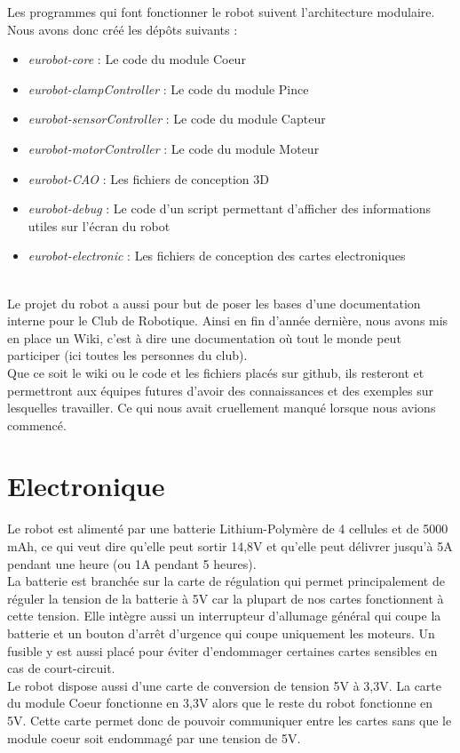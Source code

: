 Les programmes qui font fonctionner le robot suivent l'architecture modulaire. Nous avons donc créé les dépôts suivants :\\
\begin{itemize}
	\item \textit{eurobot-core} : Le code du module Coeur
	\item \textit{eurobot-clampController} : Le code du module Pince
	\item \textit{eurobot-sensorController} : Le code du module Capteur
	\item \textit{eurobot-motorController} : Le code du module Moteur
	\item \textit{eurobot-CAO} : Les fichiers de conception 3D
	\item \textit{eurobot-debug} : Le code d'un script permettant d'afficher des informations utiles sur l'écran du robot
	\item \textit{eurobot-electronic} : Les fichiers de conception des cartes electroniques
\end{itemize}\ \\

Le projet du robot a aussi pour but de poser les bases d'une documentation interne pour le Club de Robotique. Ainsi en fin d'année dernière, nous avons mis en place un Wiki, c'est à dire une documentation où tout le monde peut participer (ici toutes les personnes du club).\\

Que ce soit le wiki ou le code et les fichiers placés sur github, ils resteront et permettront aux équipes futures d'avoir des connaissances et des exemples sur lesquelles travailler. Ce qui nous avait cruellement manqué lorsque nous avions commencé.

\section{Electronique}
Le robot est alimenté par une batterie Lithium-Polymère de 4 cellules et de 5000 mAh, ce qui veut dire qu'elle peut sortir 14,8V et qu'elle peut délivrer jusqu'à 5A pendant une heure (ou 1A pendant 5 heures). \\

La batterie est branchée sur la carte de régulation qui permet principalement de réguler la tension de la batterie à 5V car la plupart de nos cartes fonctionnent à cette tension. Elle intègre aussi un interrupteur d'allumage général qui coupe la batterie et un bouton d'arrêt d'urgence qui coupe uniquement les moteurs. Un fusible y est aussi placé pour éviter d'endommager certaines cartes sensibles en cas de court-circuit. \\

Le robot dispose aussi d'une carte de conversion de tension 5V à 3,3V. La carte du module Coeur fonctionne en 3,3V alors que le reste du robot fonctionne en 5V. Cette carte permet donc de pouvoir communiquer entre les cartes sans que le module coeur soit endommagé par une tension de 5V.

